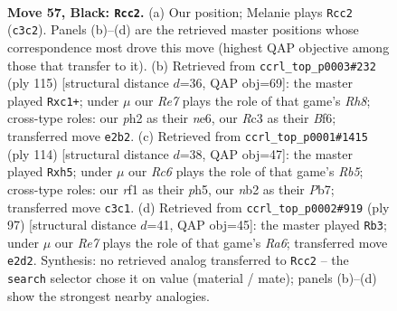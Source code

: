 \documentclass[11pt]{article}
\begin{document}
\clearpage

\begin{figure}[p]\centering
\begin{subfigure}{0.46\textwidth}\centering
\resizebox{\linewidth}{!}{%
\newchessgame
\chessboard[
  setfen={8/6k1/1pb5/p1p5/8/2r3PN/KN2rp1P/5R2 b - - 1 57},
  showmover=false,
  pgfstyle=straightmove, color=movearrow, markmove={c3-c2}
]}
\caption{}
\end{subfigure}\hfill
\begin{subfigure}{0.46\textwidth}\centering
\resizebox{\linewidth}{!}{%
\newchessgame
\chessboard[
  setfen={6k1/8/3NNbp1/5p1p/4P3/1p6/6P1/1KR4r b - - 2 58},
  showmover=false,
  pgfstyle=straightmove, color=movearrow, markmove={h1-c1}
]}
\caption{}
\end{subfigure}
\\[4pt]
\begin{subfigure}{0.46\textwidth}\centering
\resizebox{\linewidth}{!}{%
\newchessgame
\chessboard[
  setfen={1r6/1P6/4k3/1R5p/2P1p3/4Pn1K/5P1P/8 w - - 3 58},
  showmover=false,
  pgfstyle=straightmove, color=movearrow, markmove={b5-h5}
]}
\caption{}
\end{subfigure}\hfill
\begin{subfigure}{0.46\textwidth}\centering
\resizebox{\linewidth}{!}{%
\newchessgame
\chessboard[
  setfen={8/3R2pk/4N3/pP3r1p/8/r2N4/5PK1/8 b - - 0 49},
  showmover=false,
  pgfstyle=straightmove, color=movearrow, markmove={a3-b3}
]}
\caption{}
\end{subfigure}
\caption{\textbf{Move 57, Black: \texttt{Rcc2}.} (a) Our position; Melanie plays \texttt{Rcc2} (\texttt{c3c2}). Panels (b)--(d) are the retrieved master positions whose correspondence most drove this move (highest QAP objective among those that transfer to it). (b) Retrieved from \texttt{ccrl\_top\_p0003\#232} (ply 115) [structural distance $d$=36, QAP obj=69]: the master played \texttt{Rxc1+}; under $\mu$ our \emph{Re7} plays the role of that game's \emph{Rh8}; cross-type roles: our \emph{p}h2 as their \emph{n}e6, our \emph{R}c3 as their \emph{B}f6; transferred move \texttt{e2b2}. (c) Retrieved from \texttt{ccrl\_top\_p0001\#1415} (ply 114) [structural distance $d$=38, QAP obj=47]: the master played \texttt{Rxh5}; under $\mu$ our \emph{Rc6} plays the role of that game's \emph{Rb5}; cross-type roles: our \emph{r}f1 as their \emph{p}h5, our \emph{n}b2 as their \emph{P}b7; transferred move \texttt{c3c1}. (d) Retrieved from \texttt{ccrl\_top\_p0002\#919} (ply 97) [structural distance $d$=41, QAP obj=45]: the master played \texttt{Rb3}; under $\mu$ our \emph{Re7} plays the role of that game's \emph{Ra6}; transferred move \texttt{e2d2}. Synthesis: no retrieved analog transferred to \texttt{Rcc2} -- the \texttt{search} selector chose it on value (material / mate); panels (b)--(d) show the strongest nearby analogies.}
\label{fig:thought-m113}
\end{figure}
\end{document}
